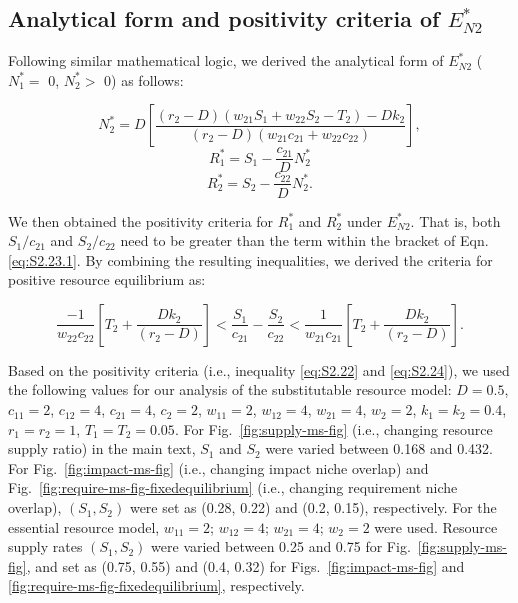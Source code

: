 \subsection*{Analytical form and positivity criteria of $E_{N2}^{*}$} 
Following similar mathematical logic, we derived the analytical form of $E_{N2}^{*}$ ($N_{1}^{*} =$  0, $N_{2}^{*} >$ 0) as follows:

\begin{equation}
N_{2}^{*} = D\left [\frac{\left ( r_2 - D\right )\left ( w_{21}S_{1}+w_{22}S_{2}-T_{2} \right )-Dk_{2}}{\left ( r_2-D \right )\left (  w_{21}c_{21}+w_{22}c_{22} \right )}\right],
\tag{S2.23.1}\label{eq:S2.23.1}
\end{equation}
\begin{equation}
R_{1}^{*} = S_1-\frac{c_{21}}{D}N_{2}^{*}
\tag{S2.23.2}\label{eq:S2.23.2}
\end{equation}
\begin{equation}
R_{2}^{*} = S_2-\frac{c_{22}}{D}N_{2}^{*}.
\tag{S2.23.3}\label{eq:S2.23.3}
\end{equation}

\noindent We then obtained the positivity criteria for $R_{1}^{*}$ and $R_{2}^{*}$ under $E_{N2}^{*}$. That is, both $S_1/c_{21}$ and $S_2/c_{22}$ need to be greater than the term within the bracket of Eqn.\ref{eq:S2.23.1}. By combining the resulting inequalities, we derived the criteria for positive resource equilibrium as:

\begin{equation}
\frac{-1}{w_{22}c_{22}}\left [ T_{2} + \frac{Dk_{2}}{\left ( r_{2}-D \right )}\right ] < \frac{S_1}{c_{21}}-\frac{S_2}{c_{22}} < \frac{1}{w_{21}c_{21}}\left [ T_{2} + \frac{Dk_{2}}{\left ( r_{2}-D \right )}\right ].
\tag{S2.24}\label{eq:S2.24}
\end{equation}

Based on the positivity criteria (i.e., inequality \ref{eq:S2.22} and \ref{eq:S2.24}), we used the following values for our analysis of the substitutable resource model: $D=0.5$, $c_{11}=2$, $c_{12}=4$, $c_{21}=4$, $c_{2}=2$, $w_{11}=2$, $w_{12}=4$, $w_{21}=4$, $w_{2}=2$, $k_{1}=k_{2}=0.4$, $r_{1}=r_{2}=1$, $T_{1}=T_{2}=0.05$. For Fig.~\ref{fig:supply-ms-fig} (i.e., changing resource supply ratio) in the main text, $S_1$ and $S_2$ were varied between 0.168 and 0.432. For Fig.~\ref{fig:impact-ms-fig} (i.e., changing impact niche overlap) and Fig.~\ref{fig:require-ms-fig-fixedequilibrium} (i.e., changing requirement niche overlap), $\left ( S_{1}, S_{2} \right )$ were set as (0.28, 0.22) and (0.2, 0.15), respectively. For the essential resource model, $w_{11}=2$; $w_{12}=4$; $w_{21}=4$; $w_{2}=2$ were used. Resource supply rates $\left ( S_{1}, S_{2} \right )$ were varied between 0.25 and 0.75 for Fig.~\ref{fig:supply-ms-fig}, and set as (0.75, 0.55) and (0.4, 0.32) for Figs.~\ref{fig:impact-ms-fig} and \ref{fig:require-ms-fig-fixedequilibrium}, respectively. 



